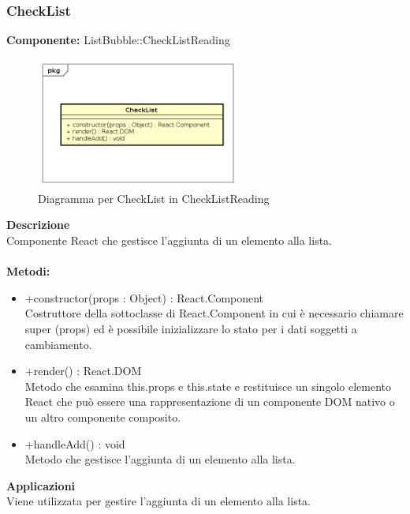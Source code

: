 \subsubsection{CheckList}
\textbf{Componente:}  ListBubble::CheckListReading\\
   \FloatBarrier
   \begin{figure}[ht]
   \centering
   \includegraphics[width=0.6\textwidth]{img/single-CheckList}
   \caption{{Diagramma per CheckList in CheckListReading}}
\end{figure}
\FloatBarrier
\textbf{Descrizione}\\
Componente React che gestisce l'aggiunta di un elemento alla lista.
\\
\\
\textbf{Metodi:} 
\begin{itemize}
\item +constructor(props : Object) : React.Component 
\\
Costruttore della sottoclasse di React.Component in cui è necessario chiamare super (props) ed è possibile inizializzare lo stato per i dati soggetti a cambiamento.

\item +render() : React.DOM 
\\
Metodo che esamina this.props e this.state e restituisce un singolo elemento React che può essere una rappresentazione di un componente DOM nativo o un altro componente composito.

\item +handleAdd() : void 
\\
Metodo che gestisce l'aggiunta di un elemento alla lista.
\end{itemize} 


\textbf{Applicazioni}\\
Viene utilizzata per gestire l'aggiunta di un elemento alla lista. 


\clearpage

